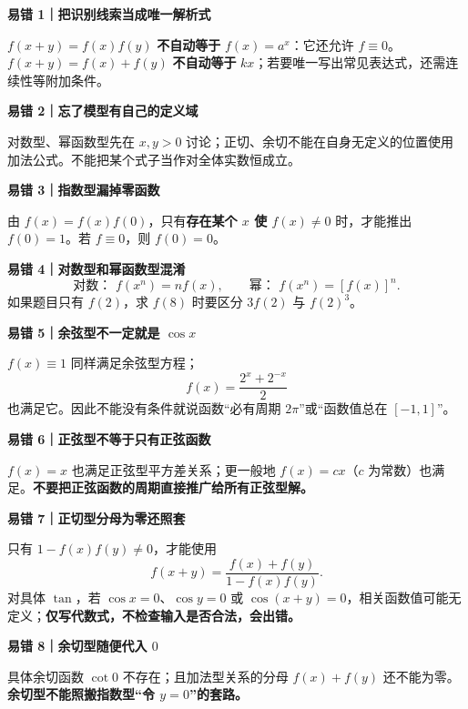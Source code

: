 \FReserve{3.5cm}
\begin{trapbox}
\textbf{\textcolor{CTrap}{易错 1｜把识别线索当成唯一解析式}}

$f(x+y)=f(x)f(y)$ \textbf{不自动等于} $f(x)=a^x$：它还允许 $f\equiv0$。$f(x+y)=f(x)+f(y)$ \textbf{不自动等于} $kx$；若要唯一写出常见表达式，还需连续性等附加条件。

\textbf{\textcolor{CTrap}{易错 2｜忘了模型有自己的定义域}}

对数型、幂函数型先在 $x,y>0$ 讨论；正切、余切不能在自身无定义的位置使用加法公式。不能把某个式子当作对全体实数恒成立。
\end{trapbox}

\FReserve{3.5cm}
\begin{trapbox}
\textbf{\textcolor{CTrap}{易错 3｜指数型漏掉零函数}}

由 $f(x)=f(x)f(0)$，只有\textbf{存在某个 $x$ 使 $f(x)\ne0$} 时，才能推出 $f(0)=1$。若 $f\equiv0$，则 $f(0)=0$。


\textbf{\textcolor{CTrap}{易错 4｜对数型和幂函数型混淆}}
\[
\text{对数： }f(x^n)=nf(x),\qquad
\text{幂： }f(x^n)=[f(x)]^n.
\]
如果题目只有 $f(2)$，求 $f(8)$ 时要区分 $3f(2)$ 与 $f(2)^3$。

\end{trapbox}

\FReserve{3.5cm}
\begin{trapbox}
\textbf{\textcolor{CTrap}{易错 5｜余弦型不一定就是 $\cos x$}}

$f(x)\equiv1$ 同样满足余弦型方程；
\[
 f(x)=\frac{2^x+2^{-x}}2
\]
也满足它。因此不能没有条件就说函数“必有周期 $2\pi$”或“函数值总在 $[-1,1]$”。

\textbf{\textcolor{CTrap}{易错 6｜正弦型不等于只有正弦函数}}

$f(x)=x$ 也满足正弦型平方差关系；更一般地 $f(x)=cx$（$c$ 为常数）也满足。\textbf{不要把正弦函数的周期直接推广给所有正弦型解。}

\end{trapbox}

\FReserve{3.5cm}
\begin{trapbox}
\textbf{\textcolor{CTrap}{易错 7｜正切型分母为零还照套}}

只有 $1-f(x)f(y)\ne0$，才能使用
\[
f(x+y)=\frac{f(x)+f(y)}{1-f(x)f(y)}.
\]
对具体 $\tan$，若 $\cos x=0$、$\cos y=0$ 或 $\cos(x+y)=0$，相关函数值可能无定义；\textbf{仅写代数式，不检查输入是否合法，会出错。}

\textbf{\textcolor{CTrap}{易错 8｜余切型随便代入 $0$}}

具体余切函数 $\cot0$ 不存在；且加法型关系的分母 $f(x)+f(y)$ 还不能为零。\textbf{余切型不能照搬指数型“令 $y=0$”的套路。}
\end{trapbox}

